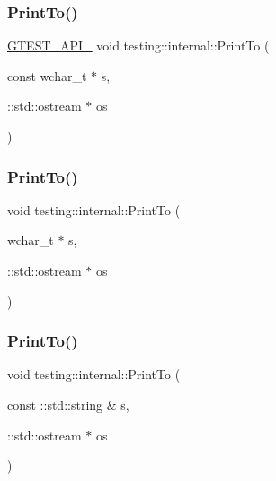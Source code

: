 \mbox{\label{namespacetesting_1_1internal_afb038075e9e2166d1d9158a19e0eed23}} 
\subsubsection{\texorpdfstring{PrintTo()}{PrintTo()}\hspace{0.1cm}{\footnotesize\ttfamily [16/23]}}
{\footnotesize\ttfamily \mbox{\hyperlink{_obj__test_2lib_2googletest-release-1_88_81_2googletest_2include_2gtest_2internal_2gtest-port_8h_aa73be6f0ba4a7456180a94904ce17790}{G\+T\+E\+S\+T\+\_\+\+A\+P\+I\+\_\+}} void testing\+::internal\+::\+Print\+To (\begin{DoxyParamCaption}\item[{const wchar\+\_\+t $\ast$}]{s,  }\item[{\+::std\+::ostream $\ast$}]{os }\end{DoxyParamCaption})}

\mbox{\label{namespacetesting_1_1internal_a8d41baa371fad3eb5a3dbe1bbc02c290}} 
\subsubsection{\texorpdfstring{PrintTo()}{PrintTo()}\hspace{0.1cm}{\footnotesize\ttfamily [17/23]}}
{\footnotesize\ttfamily void testing\+::internal\+::\+Print\+To (\begin{DoxyParamCaption}\item[{wchar\+\_\+t $\ast$}]{s,  }\item[{\+::std\+::ostream $\ast$}]{os }\end{DoxyParamCaption})\hspace{0.3cm}{\ttfamily [inline]}}

\mbox{\label{namespacetesting_1_1internal_af59b4f5d83276cd807c45063b14bad44}} 
\subsubsection{\texorpdfstring{PrintTo()}{PrintTo()}\hspace{0.1cm}{\footnotesize\ttfamily [18/23]}}
{\footnotesize\ttfamily void testing\+::internal\+::\+Print\+To (\begin{DoxyParamCaption}\item[{const \+::std\+::string \&}]{s,  }\item[{\+::std\+::ostream $\ast$}]{os }\end{DoxyParamCaption})\hspace{0.3cm}{\ttfamily [inline]}}

